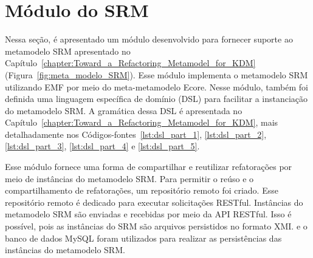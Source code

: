\section{Módulo do SRM}\label{label:sec_modulo_do_srm}

Nessa seção, é apresentado um módulo desenvolvido para fornecer suporte ao metamodelo SRM apresentado no Capítulo~\ref{chapter:Toward_a_Refactoring_Metamodel_for_KDM} (Figura~\ref{fig:meta_modelo_SRM}). Esse módulo implementa o metamodelo SRM utilizando EMF por meio do meta-metamodelo Ecore. Nesse módulo, também foi definida uma linguagem específica de domínio (DSL) para facilitar a instanciação do metamodelo SRM. A gramática dessa DSL é apresentada no Capítulo~\ref{chapter:Toward_a_Refactoring_Metamodel_for_KDM}, mais detalhadamente nos Códigos-fontes~\ref{lst:dsl_part_1}, \ref{lst:dsl_part_2}, \ref{lst:dsl_part_3}, \ref{lst:dsl_part_4} e \ref{lst:dsl_part_5}.


Esse módulo fornece uma forma de compartilhar e reutilizar refatorações por meio de instâncias do metamodelo SRM. Para permitir o reúso e o compartilhamento de refatorações, um repositório remoto foi criado. Esse repositório remoto é dedicado para executar solicitações RESTful. Instâncias do metamodelo SRM são enviadas e recebidas por meio da API RESTful. Isso é possível, pois as instâncias do SRM são arquivos persistidos no formato XMI.  e o banco de dados MySQL foram utilizados para realizar as persistências das instâncias do metamodelo SRM.


